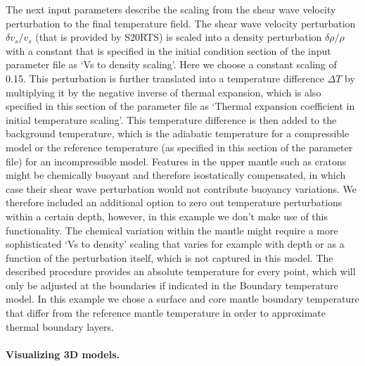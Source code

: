 \documentclass{article}
\begin{document}
The next input parameters describe the scaling from the shear wave velocity
perturbation to the final temperature field. The shear wave velocity perturbation
$\delta v_s / v_s$ (that is provided by S20RTS) is scaled into a density perturbation $\delta \rho / \rho$ with a
constant that is specified in the initial condition section of the input parameter
file as `Vs to density scaling'. Here we choose a constant scaling of 0.15. This
perturbation is further translated into a temperature difference $\Delta T$ by
multiplying it by the negative inverse of thermal expansion, which is also
specified in this section of the parameter file as `Thermal expansion coefficient
in initial temperature scaling'. This temperature difference is then added to the
background temperature, which is the adiabatic temperature for a compressible
model or the reference temperature (as specified in this section of the parameter file) for an
incompressible model. Features in the upper mantle such as cratons might
be chemically buoyant and therefore isostatically compensated, in which case
their shear wave perturbation would not contribute buoyancy variations. We therefore included an
additional option to zero out temperature perturbations within a certain depth, however, in this example we don't make use of this functionality. The chemical variation within the mantle
might require a more sophisticated `Vs to density' scaling that varies for
example with depth or as a function of the perturbation itself, which is not captured
in this model. The described procedure
provides an absolute temperature for every point, which will only be adjusted
at the boundaries if indicated in the Boundary temperature model. In this example
we chose a surface and core mantle boundary temperature that differ from the
reference mantle temperature in order to approximate thermal boundary layers.

\paragraph{Visualizing 3D models.}
\end{document}

